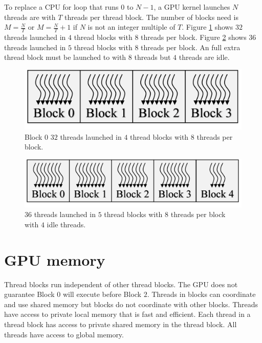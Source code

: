 To replace a CPU for loop that runs $0$ to $N-1$, a GPU kernel launches $N$ threads are with $T$ threads per thread block.
The number of blocks need is $M = \frac{N}{T}$ or $M = \frac{N}{T}+1$ if $N$ is not an integer multiple of $T$.
Figure \ref{fig:threadsBlocks32} shows $32$ threads launched in $4$ thread blocks with $8$ threads per block.
Figure \ref{fig:threadsBlocks36} shows $36$ threads launched in $5$ thread blocks with $8$ threads per block. An full extra thread block must be launched to with $8$ threads but $4$ threads are idle.
\begin{figure}
	\centering\includegraphics[width=4in/100*55]{figures/gpu_intro/threadsBlocks32.pdf}
	\caption{Block $0$ $32$ threads launched in $4$ thread blocks with $8$ threads per block.}
	\label{fig:threadsBlocks32}
\end{figure}
\begin{figure}
	\centering\includegraphics[width=5in/100*55]{figures/gpu_intro/threadsBlocks36.pdf}
	\caption{$36$ threads launched in $5$ thread blocks with $8$ threads per block with $4$ idle threads.}
	\label{fig:threadsBlocks36}
\end{figure}

\section{GPU memory}
Thread blocks run independent of other thread blocks.
The GPU does not guarantee Block $0$ will execute before Block $2$.
Threads in blocks can coordinate and use shared memory but blocks do not coordinate with other blocks.
Threads have access to private local memory that is fast and efficient.
Each thread in a thread block has access to private shared memory in the thread block.
All threads have access to global memory.

